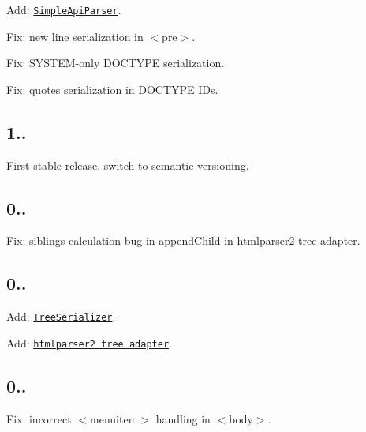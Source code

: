 \begin{DoxyItemize}
\item Add\+: \href{https://github.com/inikulin/parse5/#class-simpleapiparser}{\tt Simple\+Api\+Parser}.
\item Fix\+: new line serialization in {\ttfamily $<$pre$>$}.
\item Fix\+: {\ttfamily S\+Y\+S\+T\+EM}-\/only {\ttfamily D\+O\+C\+T\+Y\+PE} serialization.
\item Fix\+: quotes serialization in {\ttfamily D\+O\+C\+T\+Y\+PE} I\+Ds.
\end{DoxyItemize}

\subsection*{1..}


\begin{DoxyItemize}
\item First stable release, switch to semantic versioning.
\end{DoxyItemize}

\subsection*{0..}


\begin{DoxyItemize}
\item Fix\+: siblings calculation bug in {\ttfamily append\+Child} in {\ttfamily htmlparser2} tree adapter.
\end{DoxyItemize}

\subsection*{0..}


\begin{DoxyItemize}
\item Add\+: \href{https://github.com/inikulin/parse5/#class-serializer}{\tt Tree\+Serializer}.
\item Add\+: \href{https://github.com/inikulin/parse5/#-treeadaptershtmlparser2}{\tt htmlparser2 tree adapter}.
\end{DoxyItemize}

\subsection*{0..}


\begin{DoxyItemize}
\item Fix\+: incorrect {\ttfamily $<$menuitem$>$} handling in {\ttfamily $<$body$>$}.
\end{DoxyItemize}

